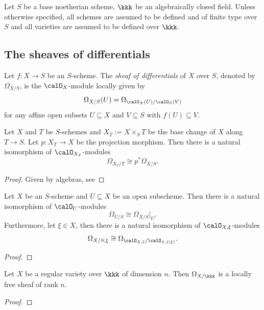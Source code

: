 Let \(S\) be a base noetherian scheme, \(\kkk\) be an algebraically closed field.
Unless otherwise specified, all schemes are assumed to be defined and of finite type over \(S\) and all varieties are assumed to be defined over \(\kkk\).

\subsection{The sheaves of differentials}

    \begin{definition}\label{def:sheaves_of_differentials}
        Let \(f:X \to S\) be an \(S\)-scheme.
        The \emph{sheaf of differentials} of \(X\) over \(S\), denoted by \(\Omega_{X/S}\), is the \(\calO_X\)-module locally given by
        \[ \Omega_{X/S}(U) = \Omega_{\calO_X(U)/\calO_S(V)} \]
        for any affine open subsets \(U \subseteq X\) and \(V \subseteq S\) with \(f(U) \subseteq V\).
    \end{definition}

    \begin{proposition}\label{prop:differential_sheaves_under_base_change}
        Let \(X\) and \(T\) be \(S\)-schemes and \(X_T := X \times_S T\) be the base change of \(X\) along \(T \to S\).
        Let \(p: X_T \to X\) be the projection morphism.
        Then there is a natural isomorphism of \(\calO_{X_T}\)-modules
        \[ \Omega_{X_T/T} \cong p^* \Omega_{X/S}. \]
    \end{proposition}
    \begin{proof}
        Given by algebras, see 
    \end{proof}

    \begin{proposition}\label{prop:differentials_sheaves_under_localization}
        Let \(X\) be an \(S\)-scheme and \(U \subseteq X\) be an open subscheme.
        Then there is a natural isomorphism of \(\calO_U\)-modules
        \[ \Omega_{U/S} \cong \Omega_{X/S}|_U. \]
        Furthermore, let \(\xi \in X\), then there is a natural isomorphism of \(\calO_{X,\xi}\)-modules
        \[ \Omega_{X/S,\xi} \cong \Omega_{\calO_{X,\xi}/\calO_{S,f(\xi)}}. \]
    \end{proposition}
    \begin{proof}
    \end{proof}

    \begin{proposition}\label{prop:Omega_X_is_locally_free_when_X_is_regular_variety}
        Let \(X\) be a regular variety over \(\kkk\) of dimension \(n\).
        Then \(\Omega_{X/\kkk}\) is a locally free sheaf of rank \(n\).
    \end{proposition}
    \begin{proof}
    \end{proof}

